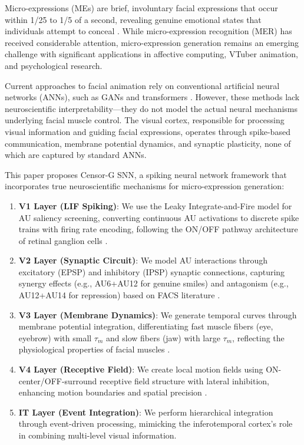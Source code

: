 \documentclass[preprint,12pt]{elsarticle}
\begin{document}
Micro-expressions (MEs) are brief, involuntary facial expressions that occur
within 1/25 to 1/5 of a second, revealing genuine emotional states that individuals
attempt to conceal \cite{ekman2009}. While micro-expression recognition (MER) has
received considerable attention, micro-expression generation remains an emerging
challenge with significant applications in affective computing, VTuber animation,
and psychological research.

Current approaches to facial animation rely on conventional artificial neural
networks (ANNs), such as GANs \cite{gan2014} and transformers \cite{transformer2017}.
However, these methods lack neuroscientific interpretability---they do not model
the actual neural mechanisms underlying facial muscle control. The visual cortex,
responsible for processing visual information and guiding facial expressions,
operates through spike-based communication, membrane potential dynamics, and
synaptic plasticity, none of which are captured by standard ANNs.

This paper proposes Censor-G SNN, a spiking neural network framework that
incorporates true neuroscientific mechanisms for micro-expression generation:

\begin{enumerate}
\item \textbf{V1 Layer (LIF Spiking)}: We use the Leaky Integrate-and-Fire model
      for AU saliency screening, converting continuous AU activations to discrete
      spike trains with firing rate encoding, following the ON/OFF pathway
      architecture of retinal ganglion cells \cite{gerstner2014}.

\item \textbf{V2 Layer (Synaptic Circuit)}: We model AU interactions through
      excitatory (EPSP) and inhibitory (IPSP) synaptic connections, capturing
      synergy effects (e.g., AU6+AU12 for genuine smiles) and antagonism
      (e.g., AU12+AU14 for repression) based on FACS literature \cite{ekman1978}.

\item \textbf{V3 Layer (Membrane Dynamics)}: We generate temporal curves through
      membrane potential integration, differentiating fast muscle fibers
      (eye, eyebrow) with small $\tau_m$ and slow fibers (jaw) with large $\tau_m$,
      reflecting the physiological properties of facial muscles \cite{dayan2001}.

\item \textbf{V4 Layer (Receptive Field)}: We create local motion fields using
      ON-center/OFF-surround receptive field structure with lateral inhibition,
      enhancing motion boundaries and spatial precision \cite{hubel1962}.

\item \textbf{IT Layer (Event Integration)}: We perform hierarchical integration
      through event-driven processing, mimicking the inferotemporal cortex's
      role in combining multi-level visual information.
\end{enumerate}
\end{document}

